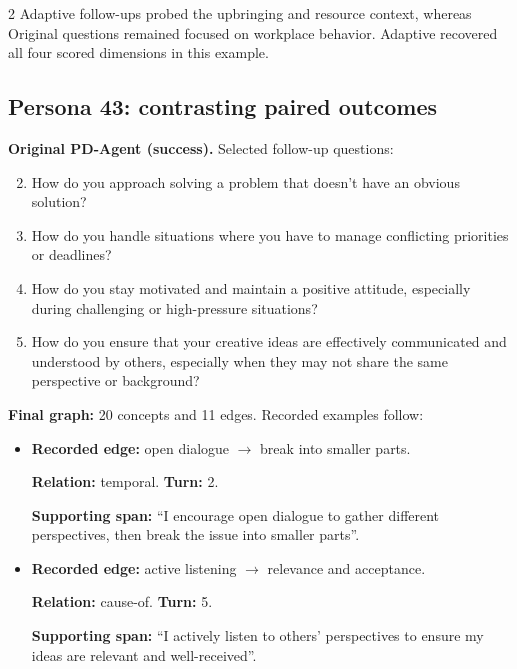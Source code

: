 \documentclass{ieeeaccess}
\begin{document}
\begin{multicols*}{2}
Adaptive follow-ups probed the upbringing and resource context, whereas Original questions remained focused on workplace behavior. Adaptive recovered all four scored dimensions in this example.

\subsection{Persona 43: contrasting paired outcomes}

\begin{samepage}
\noindent\textbf{Original PD-Agent (success).} Selected follow-up questions:\par\nopagebreak[4]
\begin{enumerate}
\setcounter{enumi}{1}
\item How do you approach solving a problem that doesn't have an obvious solution?
\item How do you handle situations where you have to manage conflicting priorities or deadlines?
\item How do you stay motivated and maintain a positive attitude, especially during challenging or high-pressure situations?
\item How do you ensure that your creative ideas are effectively communicated and understood by others, especially when they may not share the same perspective or background?
\end{enumerate}
\end{samepage}
\noindent\begin{minipage}{\linewidth}
\noindent\textbf{Final graph:} 20 concepts and 11 edges. Recorded examples follow:
\begin{itemize}
\item \textbf{Recorded edge:} open dialogue $\rightarrow$ break into smaller parts.
\par\textbf{Relation:} temporal. \textbf{Turn:} 2.
\par\textbf{Supporting span:} ``I encourage open dialogue to gather different perspectives, then break the issue into smaller parts''.
\item \textbf{Recorded edge:} active listening $\rightarrow$ relevance and acceptance.
\par\textbf{Relation:} cause-of. \textbf{Turn:} 5.
\par\textbf{Supporting span:} ``I actively listen to others' perspectives to ensure my ideas are relevant and well-received''.
\end{itemize}
\end{minipage}\par\smallskip

\end{multicols*}
\end{document}

